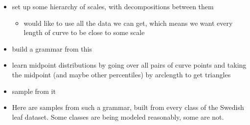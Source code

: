 

\begin{itemize}
\item set up some hierarchy of scales, with decompositions between them

\begin{itemize}
\item would like to use all the data we can get, which means we want
      every length of curve to be close to some scale
\end{itemize}

\item build a grammar from this
\item learn midpoint distributions by going over all pairs of curve
    points and taking the midpoint (and maybe other percentiles) by
    arclength to get triangles
\item sample from it
\item Here are samples from such a grammar, built from every class of
    the Swedish leaf dataset. Some classes are being modeled
    reasonably, some are not.
\end{itemize}

%

